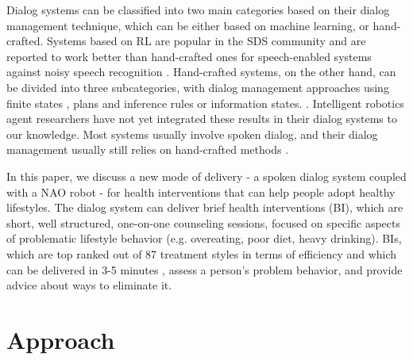 \documentclass[letterpaper]{article}
\begin{document}
Dialog systems can be classified into two main categories based on their dialog management 
technique, which can be either based on machine learning, or hand-crafted.  Systems based on RL are 
popular in the SDS community and are reported to work better than hand-crafted ones for  
speech-enabled systems against noisy speech recognition \cite{young2013pomdp}. 
Hand-crafted systems, on the other hand, can be divided into three subcategories, with dialog 
management approaches using finite states \cite{sutton1998CSLU}, plans and inference rules 
\cite{ferguson1998trips,Bohus2009} or information states. \cite{Traum03}. Intelligent robotics agent 
researchers have not yet integrated these results in their dialog systems to our knowledge. Most 
systems usually involve spoken dialog, and their dialog management usually still relies on 
hand-crafted methods \cite{morbiniFlores2012,Bickmore2010}. 

In this paper, we discuss a new mode of delivery - a spoken dialog system coupled with a NAO robot - 
for health interventions that can help people adopt healthy lifestyles.  The dialog system can 
deliver brief health interventions (BI), which are short, well structured, one-on-one counseling 
sessions, focused on specific aspects of problematic lifestyle behavior (e.g. overeating, poor diet, 
heavy drinking). BIs, which are top ranked out of 87 treatment styles in terms of efficiency 
\cite{miller2002mesa} and which can be delivered in 3-5 minutes \cite{Moyer2002}, assess a person's 
problem behavior, and provide advice about ways to eliminate it. 


\section*{Approach}
\end{document}
